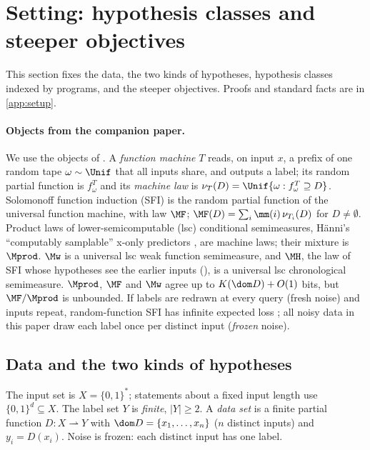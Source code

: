 \section{Setting: hypothesis classes and steeper objectives}\label{sec:setup}

This section fixes the data, the two kinds of hypotheses, hypothesis classes indexed by programs, and the steeper objectives. Proofs and standard facts are in \cref{app:setup}.

\paragraph{Objects from the companion paper.}
We use the objects of \citet{claudeSFI2026fundamentals}. A \emph{function machine} $T$ reads, on input $x$, a prefix of one random tape $\omega\sim\Unif$ that all inputs share, and outputs a label; its random partial function is $f^T_\omega$ and its \emph{machine law} is $\nu_T(D)=\Unif\{\omega:f^T_\omega\supseteq D\}$. Solomonoff function induction (SFI) is the random partial function of the universal function machine, with law $\MF$; $\MF(D)=\sum_i\mm(i)\,\nu_{T_i}(D)$ for $D\ne\emptyset$. Product laws of lower-semicomputable (lsc) conditional semimeasures, H\"anni's ``computably samplable'' x-only predictors \citep{hanni2026notes}, are machine laws; their mixture is $\Mprod$. $\Mw$ is a universal lsc weak function semimeasure, and $\MH$, the law of SFI whose hypotheses see the earlier inputs (\SFIhist{}), is a universal lsc chronological semimeasure. $\Mprod$, $\MF$ and $\Mw$ agree up to $K(\dom D)+O(1)$ bits, but $\MF/\Mprod$ is unbounded. If labels are redrawn at every query (fresh noise) and inputs repeat, random-function SFI has infinite expected loss \citep[the fresh-noise proposition]{claudeSFI2026fundamentals}; all noisy data in this paper draw each label once per distinct input (\emph{frozen} noise).

\subsection{Data and the two kinds of hypotheses}\label{sec:setup:hyp}

\begin{definition}[Data]\label{def:setup:data}
The input set is $X=\{0,1\}^*$; statements about a fixed input length use $\{0,1\}^d\subseteq X$. The label set $Y$ is \emph{finite}, $|Y|\ge2$. A \emph{data set} is a finite partial function $D:X\rightharpoonup Y$ with $\dom D=\{x_1,\dots,x_n\}$ ($n$ distinct inputs) and $y_i=D(x_i)$. Noise is frozen: each distinct input has one label.
\end{definition}

